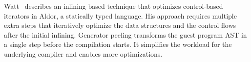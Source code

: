 Watt~\cite{watt2006technique} describes an inlining based technique that optimizes control-based iterators in Aldor, a statically typed language.
His approach requires multiple extra steps that iteratively optimize the data structures and the control flows after the initial inlining.
Generator peeling transforms the guest program AST in a single step before the compilation starts.
It simplifies the workload for the underlying compiler and enables more optimizations.
